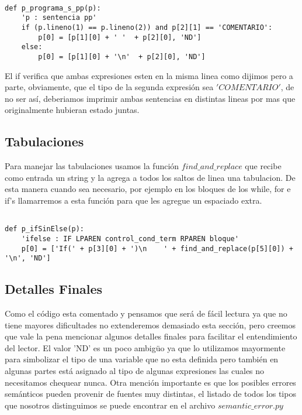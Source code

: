 \begin{verbatim}

def p_programa_s_pp(p):
    'p : sentencia pp'
    if (p.lineno(1) == p.lineno(2)) and p[2][1] == 'COMENTARIO':    	
        p[0] = [p[1][0] + ' '  + p[2][0], 'ND']
    else:
        p[0] = [p[1][0] + '\n'  + p[2][0], 'ND']

\end{verbatim} 

El if verifica que ambas expresiones esten en la misma linea como dijimos pero a parte, obviamente, que el tipo de la segunda expresión sea $'COMENTARIO'$, de no ser así, deberiamos imprimir ambas sentencias en distintas lineas por mas que originalmente hubieran estado juntas.

\subsection{Tabulaciones}

Para manejar las tabulaciones usamos la función $find\_and\_replace$ que recibe como entrada un string y la agrega a todos los saltos de linea una tabulacion. De esta manera cuando sea necesario, por ejemplo en los bloques de los while, for e if's llamarremos a esta función para que les agregue un espaciado extra.

\begin{verbatim}

def p_ifSinElse(p):
    'ifelse : IF LPAREN control_cond_term RPAREN bloque'
    p[0] = ['If(' + p[3][0] + ')\n    ' + find_and_replace(p[5][0]) + '\n', 'ND']

\end{verbatim}

\subsection{Detalles Finales}

Como el código esta comentado y pensamos que será de fácil lectura ya que no tiene mayores dificultades no extenderemos demasiado esta sección, pero creemos que vale la pena mencionar algunos detalles finales para facilitar el entendimiento del lector. El valor 'ND' es un poco ambigüo ya que lo utilizamos mayormente para simbolizar el tipo de una variable que no esta definida pero también en algunas partes está asignado al tipo de algunas expresiones las cuales no necesitamos chequear nunca. 
Otra mención importante es que los posibles errores semánticos pueden provenir de fuentes muy distintas, el listado de todos los tipos que nosotros distinguimos se puede encontrar en el archivo $semantic\_error.py$